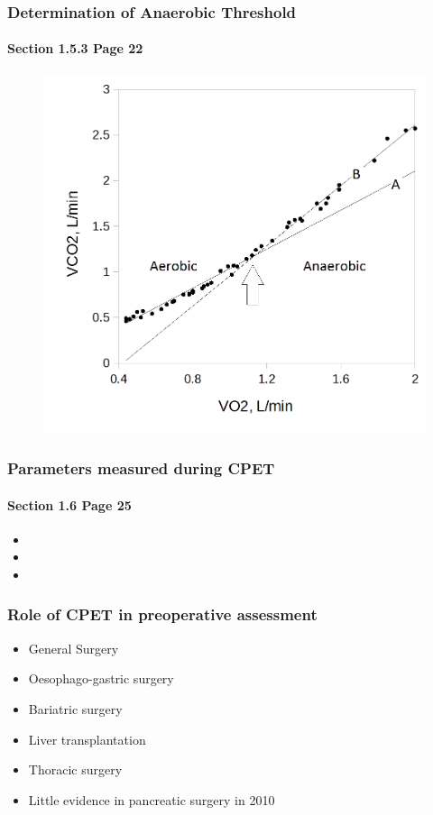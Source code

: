 \documentclass[10pt]{beamer}
\begin{document}
\begin{frame}
	\frametitle{Determination of Anaerobic Threshold}
	\framesubtitle{Section 1.5.3 Page 22}
	\begin{figure}[htbp]
		\centering
		\includegraphics[width=0.7\linewidth]{../Figures/cpet_vslope}
		\label{fig:cpet_vslope}
	\end{figure}
\end{frame}

\begin{frame}
	\frametitle{Parameters measured during CPET }
	\framesubtitle{ Section 1.6 Page 25}
	\begin{itemize}
		\item
		\item
		\item
	\end{itemize}
\end{frame}

\begin{frame}
	\frametitle{Role of CPET in preoperative assessment}
	\begin{itemize}
		\item General Surgery
		\item Oesophago-gastric surgery
		\item Bariatric surgery
		\item Liver transplantation
		\item Thoracic surgery
		\medskip
		\item Little evidence in pancreatic surgery in 2010
		
	\end{itemize}
\end{frame}
\end{document}
